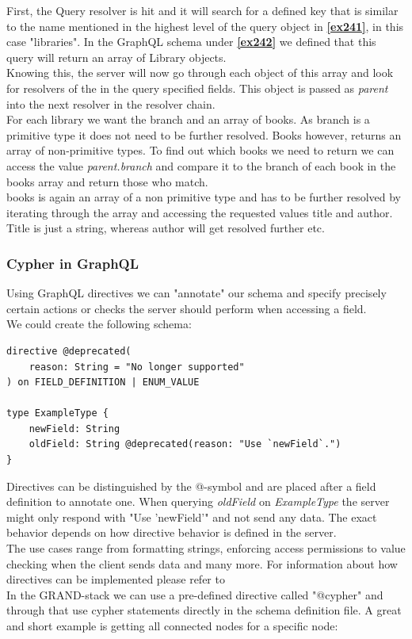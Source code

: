 First, the Query resolver is hit and it will search for a defined key that is similar to the name mentioned in the highest level of the query object in \textbf{\ref{ex241}}, in this case "libraries". In the GraphQL schema under \textbf{\ref{ex242}} we defined that this query will return an array of Library objects. \\
Knowing this, the server will now go through each object of this array and look for resolvers of the in the query specified fields. This object is passed as \emph{parent} into the next resolver in the resolver chain. \\
For each library we want the branch and an array of books. As branch is a primitive type it does not need to be further resolved. Books however, returns an array of non-primitive types. To find out which books we need to return we can access the value \emph{parent.branch} and compare it to the branch of each book in the books array and return those who match. \\
books is again an array of a non primitive type and has to be further resolved by iterating through the array and accessing the requested values title and author. Title is just a string, whereas author will get resolved further etc.

\subsubsection{Cypher in GraphQL}
Using GraphQL directives we can "annotate" our schema and specify precisely certain actions or checks the server should perform when accessing a field. \\
We could create the following schema: 

\begin{lstlisting}[caption={Example Directive Declaration}]
directive @deprecated( 
	reason: String = "No longer supported" 
) on FIELD_DEFINITION | ENUM_VALUE 

type ExampleType { 
	newField: String 
	oldField: String @deprecated(reason: "Use `newField`.")
}
\end{lstlisting}

Directives can be distinguished by the @-symbol and are placed after a field definition to annotate one. When querying \emph{oldField} on \emph{ExampleType} the server might only respond with "Use 'newField'" and not send any data. The exact behavior depends on how directive behavior is defined in the server. \\
The use cases range from formatting strings, enforcing access permissions to value checking when the client sends data and many more. For information about how directives can be implemented please refer to
\\
In the GRAND-stack we can use a pre-defined directive called "@cypher" and through that use cypher statements directly in the schema definition file. A great and short example is getting all connected nodes for a specific node:

